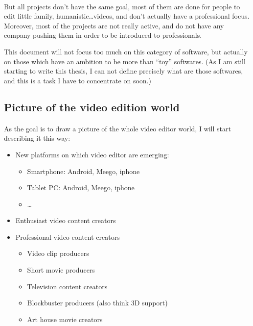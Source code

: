     \paragraph{}
        But all projects don't have the same goal, most of them are
        done for people to edit little family, humanistic\ldots videos,
        and don't actually have a professional focus. Moreover, most of the
        projects are not really active, and do not have any company pushing them
        in order to be introduced to professionals.

        This document will not focus too much on this category of software, but
        actually on those which have an ambition to be more than ``toy''
        softwares. (As I am still starting to write this thesis, I can not define
        precisely what are those softwares, and this is a task I have to
        concentrate on soon.)


    \subsection{Picture of the video edition world}
        \paragraph{}
            As the goal is to draw a picture of the whole video editor world, I
            will start describing it this way:
            \begin {itemize}
                \item {New platforms on which video editor are emerging:}
                \begin {itemize}
                    \item {Smartphone: Android, Meego, iphone}
                    \item {Tablet PC: Android, Meego, iphone}
                    \item {\ldots}
                \end {itemize}
                \item {Enthusiast video content creators}
                \item {Professional video content creators}
                \begin {itemize}
                    \item {Video clip producers}
                    \item {Short movie producers}
                    \item {Television content creators}
                    \item {Blockbuster producers (also think 3D support)}
                    \item {Art house movie creators}
                \end {itemize}
            \end {itemize}

